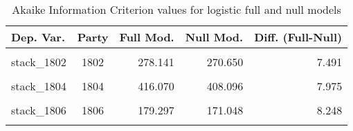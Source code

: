 \documentclass[
]{article}
\begin{document}
\begin{table}[!h]

\caption{\label{tab:unnamed-chunk-119}Akaike Information Criterion values for logistic full and null models 
        \label{table:logit_aic_lu}}
\centering
\begin{tabular}[t]{lcrrr}
\toprule
Dep. Var. & Party & Full Mod. & Null Mod. & Diff. (Full-Null)\\
\midrule
\cellcolor{gray!6}{stack\_1801} & \cellcolor{gray!6}{1801} & \cellcolor{gray!6}{374.770} & \cellcolor{gray!6}{385.253} & \cellcolor{gray!6}{-10.483}\\
stack\_1802 & 1802 & 278.141 & 270.650 & 7.491\\
\cellcolor{gray!6}{stack\_1803} & \cellcolor{gray!6}{1803} & \cellcolor{gray!6}{433.856} & \cellcolor{gray!6}{426.431} & \cellcolor{gray!6}{7.425}\\
stack\_1804 & 1804 & 416.070 & 408.096 & 7.975\\
\cellcolor{gray!6}{stack\_1805} & \cellcolor{gray!6}{1805} & \cellcolor{gray!6}{200.446} & \cellcolor{gray!6}{188.620} & \cellcolor{gray!6}{11.825}\\
\addlinespace
stack\_1806 & 1806 & 179.297 & 171.048 & 8.248\\
\cellcolor{gray!6}{stack\_1807} & \cellcolor{gray!6}{1807} & \cellcolor{gray!6}{155.919} & \cellcolor{gray!6}{152.574} & \cellcolor{gray!6}{3.345}\\
\bottomrule
\end{tabular}
\end{table}
\end{document}
